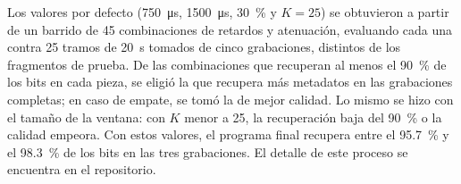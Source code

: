 \label{sec:seleccion}
Los valores por defecto (\SI{750}{\micro\second}, \SI{1500}{\micro\second}, \SI{30}{\percent} y $K = 25$) se obtuvieron a partir de un barrido de 45 combinaciones de retardos y atenuación, evaluando cada una contra 25 tramos de \SI{20}{\second} tomados de cinco grabaciones, distintos de los fragmentos de prueba. De las combinaciones que recuperan al menos el \SI{90}{\percent} de los bits en cada pieza, se eligió la que recupera más metadatos en las grabaciones completas; en caso de empate, se tomó la de mejor calidad. Lo mismo se hizo con el tamaño de la ventana: con $K$ menor a 25, la recuperación baja del \SI{90}{\percent} o la calidad empeora. Con estos valores, el programa final recupera entre el \SI{95.7}{\percent} y el \SI{98.3}{\percent} de los bits en las tres grabaciones. El detalle de este proceso se encuentra en el repositorio.
